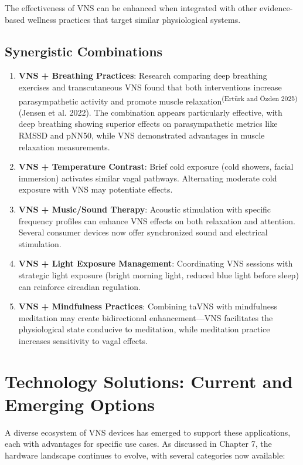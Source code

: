 \documentclass[
  Letterpaper,
]{scrbook}
\begin{document}
The effectiveness of VNS can be enhanced when integrated with other
evidence-based wellness practices that target similar physiological
systems.

\subsection{Synergistic Combinations}\label{synergistic-combinations}

\begin{enumerate}
\def\labelenumi{\arabic{enumi}.}
\item
  \textbf{VNS + Breathing Practices}: Research comparing deep breathing
  exercises and transcutaneous VNS found that both interventions
  increase parasympathetic activity and promote muscle
  relaxation\textsuperscript{(Ertürk and Özden 2025)}(Jensen et al.
  2022). The combination appears particularly effective, with deep
  breathing showing superior effects on parasympathetic metrics like
  RMSSD and pNN50, while VNS demonstrated advantages in muscle
  relaxation measurements.
\item
  \textbf{VNS + Temperature Contrast}: Brief cold exposure (cold
  showers, facial immersion) activates similar vagal pathways.
  Alternating moderate cold exposure with VNS may potentiate effects.
\item
  \textbf{VNS + Music/Sound Therapy}: Acoustic stimulation with specific
  frequency profiles can enhance VNS effects on both relaxation and
  attention. Several consumer devices now offer synchronized sound and
  electrical stimulation.
\item
  \textbf{VNS + Light Exposure Management}: Coordinating VNS sessions
  with strategic light exposure (bright morning light, reduced blue
  light before sleep) can reinforce circadian regulation.
\item
  \textbf{VNS + Mindfulness Practices}: Combining taVNS with mindfulness
  meditation may create bidirectional enhancement---VNS facilitates the
  physiological state conducive to meditation, while meditation practice
  increases sensitivity to vagal effects.
\end{enumerate}

\section{Technology Solutions: Current and Emerging
Options}\label{technology-solutions-current-and-emerging-options}

A diverse ecosystem of VNS devices has emerged to support these
applications, each with advantages for specific use cases. As discussed
in Chapter 7, the hardware landscape continues to evolve, with several
categories now available:
\end{document}

